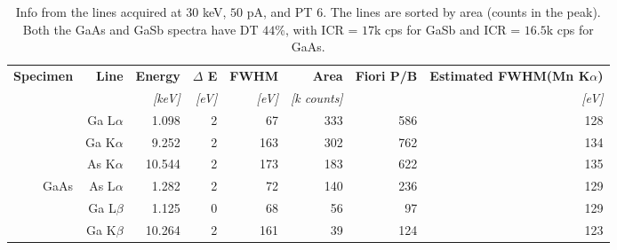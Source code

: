 \begin{table}[phtb]
    \begin{center}
        \caption{
            Info from the lines acquired at $30$ keV, $50$ pA, and PT $6$.
            The lines are sorted by area (counts in the peak).
            Both the GaAs and GaSb spectra have DT $44$\%, with ICR = $17$k cps for GaSb and ICR = $16.5$k cps for GaAs.
        }
        \renewcommand*{\arraystretch}{1.3}
        \label{tab:results:lines_info_30kV_50pA}
        \begin{tabular}{rrrrrrrr}
            \hline
            \textbf{Specimen} & \textbf{Line} & \textbf{Energy} & \textbf{$\Delta$ E} & \textbf{FWHM} & \textbf{Area}     & \textbf{Fiori P/B} & \textbf{Estimated FWHM(Mn K$\alpha$)} \\
                              &               & \emph{[keV]}    & \emph{[eV]}         & \emph{[eV]}   & \emph{[k counts]} &                    & \emph{[eV]}                           \\
            \hline
                              & Ga L$\alpha$  & 1.098           & 2                   & 67            & 333               & 586                & 128                                   \\
                              & Ga K$\alpha$  & 9.252           & 2                   & 163           & 302               & 762                & 134                                   \\
                              & As K$\alpha$  & 10.544          & 2                   & 173           & 183               & 622                & 135                                   \\
            GaAs              & As L$\alpha$  & 1.282           & 2                   & 72            & 140               & 236                & 129                                   \\
                              & Ga L$\beta$   & 1.125           & 0                   & 68            & 56                & 97                 & 129                                   \\
                              & Ga K$\beta$   & 10.264          & 2                   & 161           & 39                & 124                & 123                                   \\

\end{tabular}
\end{center}
\end{table}
